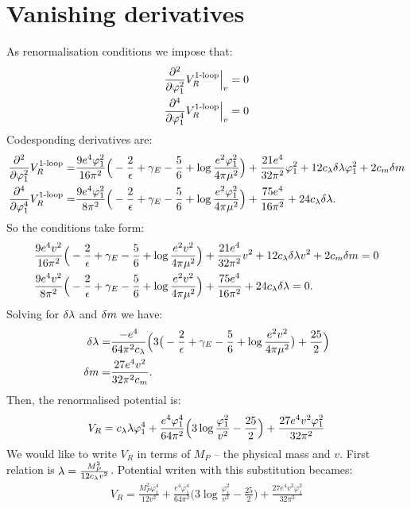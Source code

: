 \section{Vanishing derivatives}
As renormalisation conditions we impose that:
\begin{align}
\frac{\partial^2 }{\partial \varphi_1^2}V_R^{\textrm{1-loop}}\Big|_{v} &= 0 \\
\frac{\partial^4 }{\partial \varphi_1^4}V_R^{\textrm{1-loop}}\Big|_{v} &= 0
\end{align}
Codesponding derivatives are:
\begin{align}
\frac{\partial^2 }{\partial \varphi_1^2}V_R^{\textrm{1-loop}} = &\frac{9e^4\varphi_1^2}{16\pi^2}\Big(-\frac{2}{\epsilon}+\gamma_E-
\frac{5}{6}+\log{\frac{e^2\varphi_1^2}{4\pi\mu^2}}\Big)+\frac{21e^4}{32\pi^2}\varphi_1^2+ 
12c_\lambda\delta\lambda\varphi_1^2+2c_m\delta m \\
\frac{\partial^4 }{\partial \varphi_1^4}V_R^{\textrm{1-loop}} = &\frac{9e^4\varphi_1^2}{8\pi^2}\Big(-\frac{2}{\epsilon}+\gamma_E-
\frac{5}{6}+\log{\frac{e^2\varphi_1^2}{4\pi\mu^2}}\Big)+\frac{75e^4}{16\pi^2}+24c_\lambda\delta\lambda.
\end{align}
So the conditions take form:
\begin{align}
&\frac{9e^4v^2}{16\pi^2}\Big(-\frac{2}{\epsilon}+\gamma_E-
\frac{5}{6}+\log{\frac{e^2v^2}{4\pi\mu^2}}\Big)+\frac{21e^4}{32\pi^2}v^2+ 
12c_\lambda\delta\lambda v^2+2c_m\delta m = 0\\
&\frac{9e^4v^2}{8\pi^2}\Big(-\frac{2}{\epsilon}+\gamma_E-
\frac{5}{6}+\log{\frac{e^2v^2}{4\pi\mu^2}}\Big)+\frac{75e^4}{16\pi^2}+24c_\lambda\delta\lambda = 0.
\end{align}
Solving for $\delta\lambda$ and $\delta m$ we have:
\begin{align}
\delta\lambda = &\frac{-e^4}{64\pi^2c_\lambda}\Big(3\big(-\frac{2}{\epsilon}+\gamma_E-
\frac{5}{6}+\log\frac{e^2v^2}{4\pi\mu^2}\big)+\frac{25}{2}\Big) \\
\delta m = &\frac{27e^4v^2}{32\pi^2c_m}.
\end{align}
Then, the renormalised potential is:
\begin{align}
V_R = c_\lambda\lambda\varphi_1^4 + \frac{e^4\varphi_1^4}{64\pi^2}\Big(3\log\frac{\varphi_1^2}{v^2}- 
\frac{25}{2}\Big)+
\frac{27e^4v^2\varphi_1^2}{32\pi^2}
\end{align}
We would like to write $V_R$ in terms of $M_P$ -- the physical mass and $v$.
First relation is $\lambda = \frac{M_P^2}{12c_\lambda v^2}$. Potential writen with this substitution 
becames:
\begin{align}
V_R = \frac{M_P^2\varphi_1^4}{12v^2} + \frac{e^4\varphi_1^4}{64\pi^2}\Big(3\log
\frac{\varphi_1^2}{v^2}- 
\frac{25}{2}\Big)+
\frac{27e^4v^2\varphi_1^2}{32\pi^2}
\end{align}
